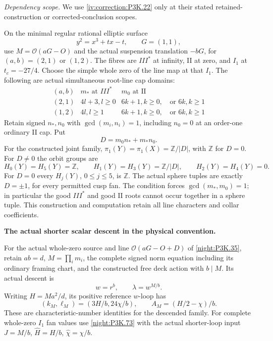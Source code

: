 \begin{theorem}\hypertarget{tag-02SP}{}\label{night:P3F.47}

\par\noindent\textit{Dependency scope.} We use \cref{iv:correction:P3K.22} only at their stated retained-construction or corrected-conclusion scopes.


On the minimal regular rational elliptic surface
\[
 y^2=x^3+tx-t,\qquad G=(1,1),
\]
use $M=\mathcal O(aG-O)$ and the actual suspension translation
$-bG$, for $(a,b)=(2,1)$ or $(1,2)$. The fibres are
$III^*$ at infinity, II at zero, and $I_1$ at $t_c=-27/4$.
Choose the simple whole zero of the line map at that $I_1$.
The following are actual simultaneous root-line cap domains:
\[
\begin{array}{c|c|c}
(a,b)&m_*\text{ at }III^*&m_0\text{ at II}\\ \hline
(2,1)&4l+3, l\geq0&6k+1, k\geq0,\quad\text{or }6k, k\geq1\\
(1,2)&4l, l\geq1&6k+1, k\geq0,\quad\text{or }6k, k\geq1
\end{array}                                            \tag{F47.1}
\]
Retain signed $n_*,n_0$ with $\gcd(m_i,n_i)=1$, including
$n_0=0$ at an order-one ordinary II cap. Put
\[
                         D=m_0n_*+m_*n_0.              \tag{F47.2}
\]
For the constructed joint family,
$\pi_1(Y)=\pi_1(X)=\mathbb Z/|D|$, with $\mathbb Z$ for $D=0$.
For $D\ne0$ the orbit groups are
\[
 H_0(Y)=H_5(Y)=\mathbb Z,\qquad
 H_1(Y)=H_3(Y)=\mathbb Z/|D|,\qquad H_2(Y)=H_4(Y)=0.
\]
For $D=0$ every $H_j(Y)$, $0\leq j\leq5$, is $\mathbb Z$.
The actual sphere tuples are exactly $D=\pm1$, for every
permitted cusp fan. The condition forces $\gcd(m_*,m_0)=1$;
in particular the good $III^*$ and good II roots cannot occur
together in a sphere tuple. This construction and computation
retain all line characters and collar coefficients.
\end{theorem}

\begin{proposition}\hypertarget{tag-01UC}{}\label{iv:correction:P3K.35}

\textbf{The actual shorter scalar descent in the physical convention.}\par
For the actual whole-zero source and line
\(\mathcal O(aG-O+D)\) of \cref{night:P3K.35}, retain
\(ab=d\), \(M=\prod_i m_i\), the complete signed norm
equation including its ordinary framing chart, and the constructed
free deck action with \(b\mid M\). Its actual descent is
\[
 w=r^b,\qquad \lambda=w^{M/b}.
\]
Writing \(H=Ma^2/d\), its positive reference \(w\)-loop has
\[
 (k_M,\ell_M)=(3H/b,24\chi/b),\qquad
 A_M=(H/2-\chi)/b.
\]
These are characteristic-number identities for the descended
family. For complete whole-zero \(I_1\) fan values use
\cref{night:P3K.73} with the actual shorter-loop input
\(J=M/b\), \(\widehat H=H/b\), \(\widehat\chi=\chi/b\).
\end{proposition}


